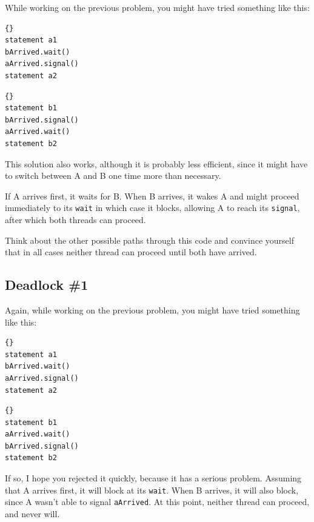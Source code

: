 \documentclass{book}
\begin{document}
While working on the previous problem, you might have
tried something like this:

\begin{minipage}[t]{2in}
\begin{lstlisting}[title={Thread A}]{}
statement a1
bArrived.wait()
aArrived.signal()
statement a2
\end{lstlisting}
\end{minipage}
\hfill
\begin{minipage}[t]{2in}
\begin{lstlisting}[title={Thread B}]{}
statement b1
bArrived.signal()
aArrived.wait()
statement b2
\end{lstlisting}
\end{minipage}

This solution also works, although it is probably less
efficient, since it might have to switch between A and B
one time more than necessary.

If A arrives first, it waits for B.  When B arrives, it wakes
A and might proceed immediately to its {\tt wait} in which
case it blocks, allowing A to reach its {\tt signal}, after
which both threads can proceed.

Think about the other possible paths through this code and
convince yourself that in all cases neither thread can
proceed until both have arrived.

\subsection {Deadlock \#1}

Again, while working on the previous problem, you might have
tried something like this:

\begin{minipage}[t]{2in}
\begin{lstlisting}[title={Thread A}]{}
statement a1
bArrived.wait()
aArrived.signal()
statement a2
\end{lstlisting}
\end{minipage}
\hfill
\begin{minipage}[t]{2in}
\begin{lstlisting}[title={Thread B}]{}
statement b1
aArrived.wait()
bArrived.signal()
statement b2
\end{lstlisting}
\end{minipage}

If so, I hope you rejected it quickly, because it has a serious
problem.  Assuming that A arrives first, it will block at its
{\tt wait}.  When B arrives, it will also block, since A wasn't
able to signal {\tt aArrived}.  At this point, neither thread
can proceed, and never will.
\end{document}
